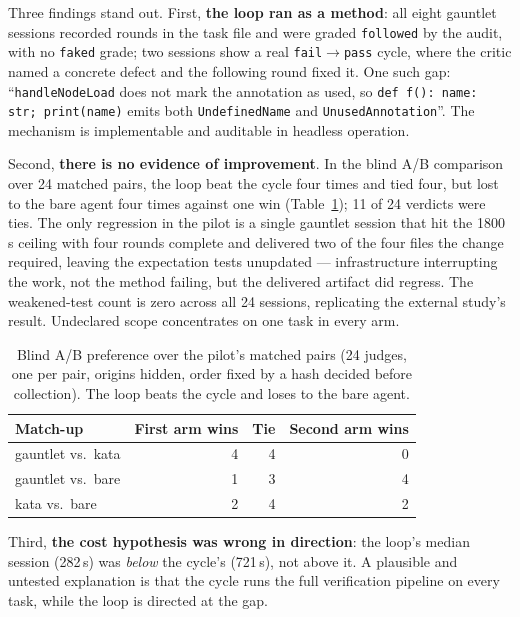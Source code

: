 \documentclass[11pt]{article}
\begin{document}
Three findings stand out. First, \textbf{the loop ran as a method}: all eight
gauntlet sessions recorded rounds in the task file and were graded
\texttt{followed} by the audit, with no \texttt{faked} grade; two sessions show
a real \texttt{fail}$\to$\texttt{pass} cycle, where the critic named a concrete
defect and the following round fixed it. One such gap: ``\texttt{handleNodeLoad}
does not mark the annotation as used, so \texttt{def f(): name: str;
print(name)} emits both \texttt{UndefinedName} and \texttt{UnusedAnnotation}''.
The mechanism is implementable and auditable in headless operation.

Second, \textbf{there is no evidence of improvement}. In the blind A/B
comparison over 24 matched pairs, the loop beat the cycle four times and tied
four, but lost to the bare agent four times against one win
(Table~\ref{tab:gauntlet-ab}); 11 of 24 verdicts were ties. The only regression
in the pilot is a single gauntlet session that hit the 1800\,s ceiling with
four rounds complete and delivered two of the four files the change required,
leaving the expectation tests unupdated --- infrastructure interrupting the
work, not the method failing, but the delivered artifact did regress. The
weakened-test count is zero across all 24 sessions, replicating the external
study's result. Undeclared scope concentrates on one task in every arm.

\begin{table}[!ht]
\caption{Blind A/B preference over the pilot's matched pairs (24 judges, one
per pair, origins hidden, order fixed by a hash decided before collection).
The loop beats the cycle and loses to the bare agent.}
\centering
\footnotesize
\begin{tabular}{@{}lrrr@{}}
\toprule
Match-up & First arm wins & Tie & Second arm wins \\
\midrule
gauntlet vs.\ kata & 4 & 4 & 0 \\
gauntlet vs.\ bare & 1 & 3 & 4 \\
kata vs.\ bare & 2 & 4 & 2 \\
\bottomrule
\end{tabular}
\label{tab:gauntlet-ab}
\end{table}

Third, \textbf{the cost hypothesis was wrong in direction}: the loop's median
session (282\,s) was \emph{below} the cycle's (721\,s), not above it. A
plausible and untested explanation is that the cycle runs the full verification
pipeline on every task, while the loop is directed at the gap.
\end{document}
